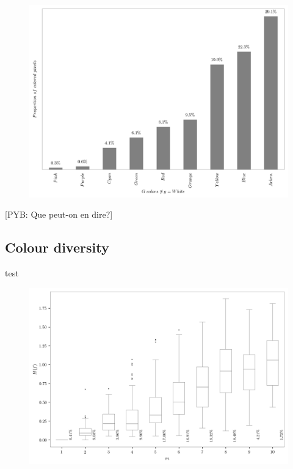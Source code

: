\documentclass[11pt,a4paper]{article}
\begin{document}
\begin{figure}[!h]
	\centering
	\includegraphics[width=\linewidth]{figures/colors-barplot.png}
	\caption{ }
	\label{fig:propcolours}
\end{figure}

 [PYB: Que peut-on en dire?]




\subsection{Colour diversity}

test 

\begin{figure}[h!]
	\centering
	\includegraphics[width=\linewidth]{figures/colors-boxplot.png}
	\caption{ }
	\label{}
\end{figure}
\end{document}

